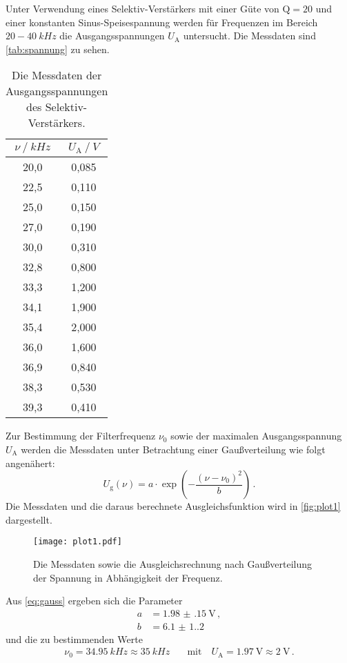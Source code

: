 Unter Verwendung eines Selektiv-Verstärkers mit einer Güte von $\text{Q} = 20$
und einer konstanten Sinus-Speisespannung %
werden für Frequenzen im Bereich $20 - \qty{40}{kHz}$ die
Ausgangsspannungen $U_\text{A}$ untersucht.
Die Messdaten sind \autoref{tab:spannung} zu sehen.
\begin{table}[H]
  \centering
  \caption{Die Messdaten der Ausgangsspannungen des Selektiv-Verstärkers.}
  \label{tab:spannung}
  \begin{tabular}{c c}
    \toprule
    $\nu \mathbin{/} \unit{kHz}$ & $U_\text{A} \mathbin{/} \unit{V}$ \\
    \midrule
      20,0 & 0,085 \\
      22,5 & 0,110 \\
      25,0 & 0,150 \\
      27,0 & 0,190 \\
      30,0 & 0,310 \\
      32,8 & 0,800 \\
      33,3 & 1,200 \\
      34,1 & 1,900 \\
      35,4 & 2,000 \\
      36,0 & 1,600 \\
      36,9 & 0,840 \\
      38,3 & 0,530 \\
      39,3 & 0,410 \\
    \bottomrule
  \end{tabular}
\end{table}

Zur Bestimmung der Filterfrequenz $\nu_\text{0}$ sowie der maximalen Ausgangsspannung $U_\text{A}$ 
werden die Messdaten unter Betrachtung einer Gaußverteilung wie folgt angenähert:
\begin{equation}\label{eq:gauss}
  U_\text{g}(\nu) = a \cdot \exp\left( -\frac{(\nu-\nu_\text{0})^2}{b} \right) \, .
\end{equation}
Die Messdaten und die daraus berechnete Ausgleichsfunktion wird in \autoref{fig:plot1} dargestellt.
\begin{figure}
  \centering
  \texttt{[image: plot1.pdf]}
  \caption{Die Messdaten sowie die Ausgleichsrechnung nach Gaußverteilung der Spannung in Abhängigkeit der Frequenz.}
  \label{fig:plot1}
\end{figure}
Aus \autoref{eq:gauss} ergeben sich die Parameter
\begin{align*}
  a &= \qty{1.98(15)}{\volt} \, ,\\
  b &= \num{6.1(1.2)} 
\end{align*}
und die zu bestimmenden Werte
\begin{align*}
  \nu_\text{0} = \qty{34.95}{kHz} \approx \qty{35}{kHz} &\quad 
  \text{mit} \quad U_\text{A} = \qty{1.97}{\volt} \approx \qty{2}{\volt} \, .
\end{align*}




